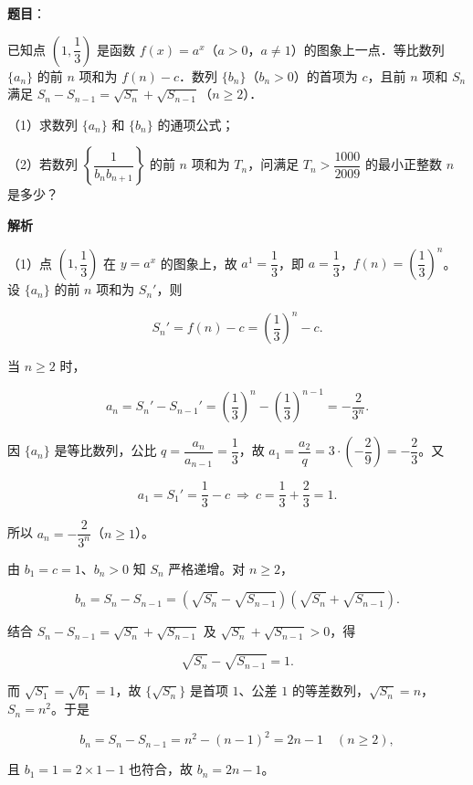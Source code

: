 \begin{answer}

\textbf{题目}：

已知点 $\left(1,\dfrac13\right)$ 是函数 $f(x)=a^x$（$a>0$，$a\neq1$）的图象上一点．等比数列 $\{a_n\}$ 的前 $n$ 项和为 $f(n)-c$．数列 $\{b_n\}$（$b_n>0$）的首项为 $c$，且前 $n$ 项和 $S_n$ 满足 $S_n-S_{n-1}=\sqrt{S_n}+\sqrt{S_{n-1}}$（$n\geqslant2$）．

（1）求数列 $\{a_n\}$ 和 $\{b_n\}$ 的通项公式；

（2）若数列 $\left\{\dfrac{1}{b_nb_{n+1}}\right\}$ 的前 $n$ 项和为 $T_n$，问满足 $T_n>\dfrac{1000}{2009}$ 的最小正整数 $n$ 是多少？

\textbf{解析}

（1）点 $\left(1,\dfrac13\right)$ 在 $y=a^x$ 的图象上，故 $a^1=\dfrac13$，即 $a=\dfrac13$，$f(n)=\left(\dfrac13\right)^n$。设 $\{a_n\}$ 的前 $n$ 项和为 $S_n'$，则

\nopagebreak[4]
\[S_n'=f(n)-c=\left(\frac13\right)^n-c.\]

当 $n\geqslant2$ 时，

\nopagebreak[4]
\[a_n=S_n'-S_{n-1}'=\left(\frac13\right)^n-\left(\frac13\right)^{n-1}=-\frac{2}{3^n}.\]

因 $\{a_n\}$ 是等比数列，公比 $q=\dfrac{a_n}{a_{n-1}}=\dfrac13$，故 $a_1=\dfrac{a_2}{q}=3\cdot\left(-\dfrac29\right)=-\dfrac23$。又

\nopagebreak[4]
\[a_1=S_1'=\frac13-c\ \Longrightarrow\ c=\frac13+\frac23=1.\]

所以 $a_n=-\dfrac{2}{3^n}$（$n\geqslant1$）。

由 $b_1=c=1$、$b_n>0$ 知 $S_n$ 严格递增。对 $n\geqslant2$，

\nopagebreak[4]
\[b_n=S_n-S_{n-1}=(\sqrt{S_n}-\sqrt{S_{n-1}})(\sqrt{S_n}+\sqrt{S_{n-1}}).\]

结合 $S_n-S_{n-1}=\sqrt{S_n}+\sqrt{S_{n-1}}$ 及 $\sqrt{S_n}+\sqrt{S_{n-1}}>0$，得

\nopagebreak[4]
\[\sqrt{S_n}-\sqrt{S_{n-1}}=1.\]

而 $\sqrt{S_1}=\sqrt{b_1}=1$，故 $\{\sqrt{S_n}\}$ 是首项 $1$、公差 $1$ 的等差数列，$\sqrt{S_n}=n$，$S_n=n^2$。于是

\nopagebreak[4]
\[b_n=S_n-S_{n-1}=n^2-(n-1)^2=2n-1\quad(n\geqslant2),\]

且 $b_1=1=2\times1-1$ 也符合，故 $b_n=2n-1$。


\end{answer}
